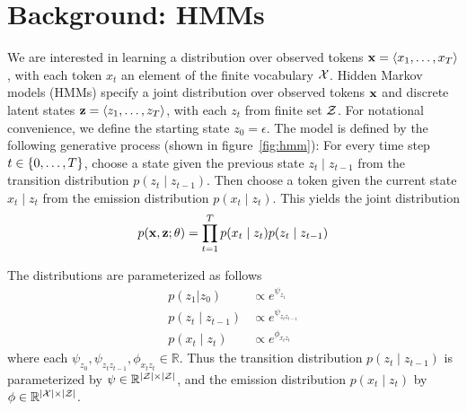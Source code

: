\documentclass[11pt,a4paper]{article}
\begin{document}
\section{Background: HMMs}

We are interested in learning a distribution over observed tokens
$\mathbf{x} = \langle x_1, \ldots, x_T \rangle$, with each token $x_t$
an element of the finite vocabulary $\mathcal{X}$.
Hidden Markov models (HMMs) specify a joint distribution over 
observed tokens $\mathbf{x}$ and discrete latent states $\mathbf{z} = \langle z_1, \ldots, z_T \rangle$,
with each $z_t$ from finite set $\mathcal{Z}$.
For notational convenience, we define the starting state $z_0=\epsilon$.
The model is defined by the following generative process (shown in figure~\ref{fig:hmm}):
For every time step $t \in \left\{0,\ldots,T\right\}$, choose a state given the previous state
$z_t \mid z_{t-1}$ from the transition distribution $p(z_t \mid z_{t-1})$.
Then choose a token given the current state $x_t \mid z_t$
from the emission distribution $p(x_t \mid z_t)$.
This yields the joint distribution
\begin{equation}
p(\mathbf{x}, \mathbf{z}; \theta)
= \prod_{t=1}^T p(x_t\mid z_t)p(z_t \mid z_{t-1})
\end{equation}



\noindent The distributions are parameterized as follows
\begin{equation}
\label{param}
\begin{aligned}
p(z_1 | z_0) &\propto e^{\psi_{z_1}}\\
p(z_t \mid z_{t-1}) &\propto e^{\psi_{z_tz_{t-1}}}\\
p(x_t \mid z_t) &\propto e^{\phi_{x_tz_t}}
\end{aligned}
\end{equation}
where each $\psi_{z_0},\psi_{z_tz_{t-1}},\phi_{x_tz_t} \in \mathbb{R}$.
Thus the transition distribution $p(z_t \mid z_{t-1})$ is parameterized by
$\psi \in \mathbb{R}^{|\mathcal{Z}|\times|\mathcal{Z}|}$,
and the emission distribution $p(x_t \mid z_{t})$ by $\phi \in \mathbb{R}^{|\mathcal{X}| \times |\mathcal{Z}|}$.
\end{document}
